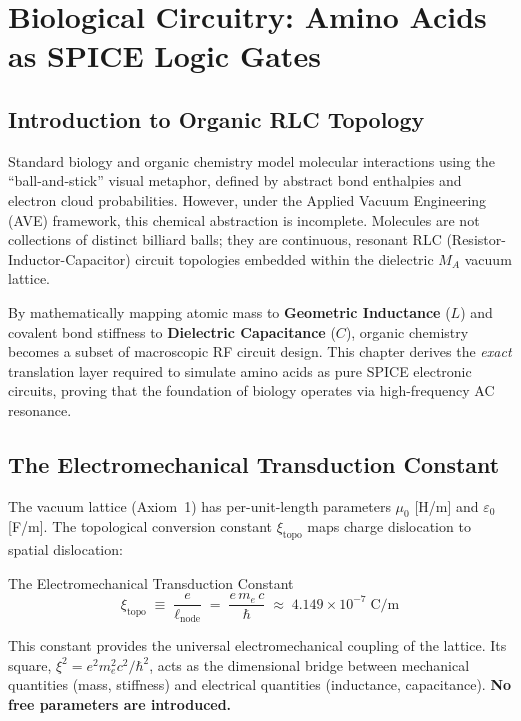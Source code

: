 \chapter{Biological Circuitry: Amino Acids as SPICE Logic Gates}
\label{ch:biological_circuitry}

\section{Introduction to Organic RLC Topology}

Standard biology and organic chemistry model molecular interactions using the ``ball-and-stick'' visual metaphor, defined by abstract bond enthalpies and electron cloud probabilities. However, under the Applied Vacuum Engineering (AVE) framework, this chemical abstraction is incomplete. Molecules are not collections of distinct billiard balls; they are continuous, resonant RLC (Resistor-Inductor-Capacitor) circuit topologies embedded within the dielectric $M_A$ vacuum lattice.

By mathematically mapping atomic mass to \textbf{Geometric Inductance} ($L$) and covalent bond stiffness to \textbf{Dielectric Capacitance} ($C$), organic chemistry becomes a subset of macroscopic RF circuit design. This chapter derives the \emph{exact} translation layer required to simulate amino acids as pure SPICE electronic circuits, proving that the foundation of biology operates via high-frequency AC resonance.

\section{The Electromechanical Transduction Constant}

The vacuum lattice (Axiom~1) has per-unit-length parameters $\mu_0$ [H/m] and $\varepsilon_0$ [F/m]. The topological conversion constant $\xi_\text{topo}$ maps charge dislocation to spatial dislocation:
\begin{resultbox}{The Electromechanical Transduction Constant}
\begin{equation}
    \xi_\text{topo} \;\equiv\; \frac{e}{\ell_\text{node}}
    \;=\; \frac{e \, m_e \, c}{\hbar}
    \;\approx\; 4.149 \times 10^{-7} \;\text{C/m}
    \label{eq:xi_topo}
\end{equation}
\end{resultbox}
This constant provides the universal electromechanical coupling of the lattice. Its square, $\xi^2 = e^2 m_e^2 c^2 / \hbar^2$, acts as the dimensional bridge between mechanical quantities (mass, stiffness) and electrical quantities (inductance, capacitance). \textbf{No free parameters are introduced.}

